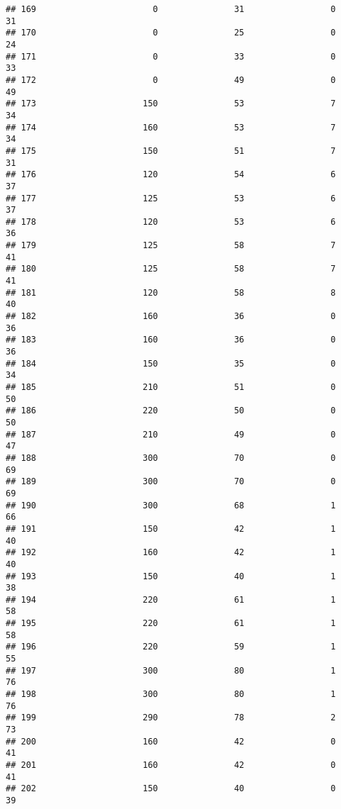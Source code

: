 \documentclass[
]{article}
\begin{document}
\begin{verbatim}
## 169                       0               31                 0         31
## 170                       0               25                 0         24
## 171                       0               33                 0         33
## 172                       0               49                 0         49
## 173                     150               53                 7         34
## 174                     160               53                 7         34
## 175                     150               51                 7         31
## 176                     120               54                 6         37
## 177                     125               53                 6         37
## 178                     120               53                 6         36
## 179                     125               58                 7         41
## 180                     125               58                 7         41
## 181                     120               58                 8         40
## 182                     160               36                 0         36
## 183                     160               36                 0         36
## 184                     150               35                 0         34
## 185                     210               51                 0         50
## 186                     220               50                 0         50
## 187                     210               49                 0         47
## 188                     300               70                 0         69
## 189                     300               70                 0         69
## 190                     300               68                 1         66
## 191                     150               42                 1         40
## 192                     160               42                 1         40
## 193                     150               40                 1         38
## 194                     220               61                 1         58
## 195                     220               61                 1         58
## 196                     220               59                 1         55
## 197                     300               80                 1         76
## 198                     300               80                 1         76
## 199                     290               78                 2         73
## 200                     160               42                 0         41
## 201                     160               42                 0         41
## 202                     150               40                 0         39

\end{verbatim}
\end{document}
